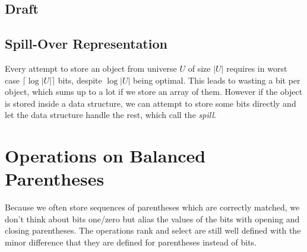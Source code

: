 \subsection{Draft}



\subsection{Spill-Over Representation}

Every attempt to store an object from universe $U$ of size $|U|$ requires in worst case $\lceil \log |U| \rceil$ bits, despite $\log |U|$ being optimal.
This leads to wasting a bit per object, which sums up to a lot if we store an array of them.
However if the object is stored inside a data structure, we can attempt to store some bits directly and let the data structure handle the rest, which call the \emph{spill}.


\section{Operations on Balanced Parentheses}

Because we often store sequences of parentheses which are correctly matched, we don't think about bits one/zero but alias the values of the bits with opening and closing parentheses.
The operations rank and select are still well defined with the minor difference that they are defined for parentheses instead of bits.


